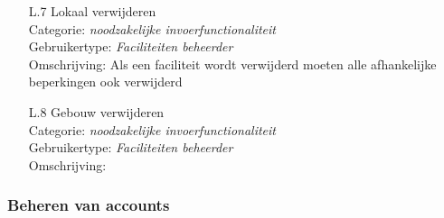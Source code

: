 \documentclass{article}
\begin{document}
\begin{itemize}
\item[L.7] Lokaal verwijderen \\
Categorie: \textit{noodzakelijke invoerfunctionaliteit} \\
Gebruikertype: \textit{Faciliteiten beheerder}  \\
Omschrijving: Als een faciliteit wordt verwijderd moeten alle afhankelijke beperkingen ook verwijderd \\[-3mm]

\item[L.8] Gebouw verwijderen  \\
Categorie: \textit{noodzakelijke invoerfunctionaliteit} \\
Gebruikertype: \textit{Faciliteiten  beheerder} \\
Omschrijving: \\[-3mm]
\end{itemize}

\subsubsection{Beheren van accounts}
\end{document}
